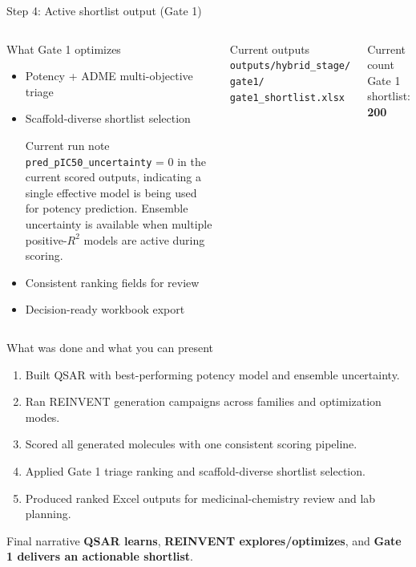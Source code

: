 \documentclass[aspectratio=169,10pt]{beamer}
\begin{document}
\begin{frame}{Step 4: Active shortlist output (Gate 1)}
  \begin{columns}[T]
      \begin{block}{What Gate 1 optimizes}
        \begin{itemize}
          \item Potency + ADME multi-objective triage
          \item Scaffold-diverse shortlist selection
      \begin{alertblock}{Current run note}
        \texttt{pred\_pIC50\_uncertainty} = 0 in the current scored outputs,
        indicating a single effective model is being used for potency prediction.
        Ensemble uncertainty is available when multiple positive-\(R^2\) models
        are active during scoring.
      \end{alertblock}
          \item Consistent ranking fields for review
          \item Decision-ready workbook export
        \end{itemize}
      \end{block}
      \begin{block}{Current outputs}
        \texttt{outputs/hybrid\_stage/}\\
        \texttt{gate1/}\\
        \texttt{gate1\_shortlist.xlsx}
      \end{block}
      \begin{exampleblock}{Current count}
        Gate 1 shortlist: \textbf{200}
      \end{exampleblock}
  \end{columns}
\end{frame}

\begin{frame}{What was done and what you can present}
  \small
  \begin{enumerate}
    \item Built QSAR with best-performing potency model and ensemble uncertainty.
    \item Ran REINVENT generation campaigns across families and optimization modes.
    \item Scored all generated molecules with one consistent scoring pipeline.
    \item Applied Gate 1 triage ranking and scaffold-diverse shortlist selection.
    \item Produced ranked Excel outputs for medicinal-chemistry review and lab planning.
  \end{enumerate}

  \vspace{4pt}
  \begin{block}{Final narrative}
    \textbf{QSAR learns}, \textbf{REINVENT explores/optimizes},
    and \textbf{Gate 1 delivers an actionable shortlist}.
  \end{block}
\end{frame}
\end{document}

